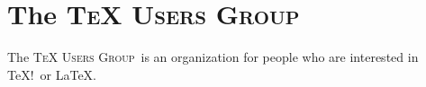 \documentclass{article}
\newcommand{\TUG} {\textsc{TeX Users Group}}
\begin{document}
\section{The \TUG}
The \TUG\ is an organization for people who are interested in \TeX!\ or \LaTeX.
\end{document}
